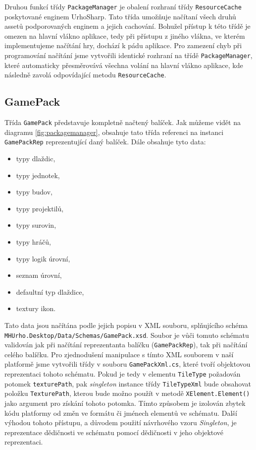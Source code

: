 Druhou funkcí třídy \texttt{PackageManager} je obalení rozhraní třídy \texttt{ResourceCache} poskytované enginem UrhoSharp. Tato třída umožňuje načítaní všech druhů assetů podporovaných enginem a jejich cachování. Bohužel přístup k této třídě je omezen na hlavní vlákno aplikace, tedy při přístupu z jiného vlákna, ve kterém implementujeme načítání hry, dochází k pádu aplikace. Pro zamezení chyb při programování načítání jsme vytvořili identické rozhraní na třídě \texttt{PackageManager}, které automaticky přesměrovává všechna volání na hlavní vlákno aplikace, kde následně zavolá odpovídající metodu \texttt{ResourceCache}.


\subsection{GamePack}
\label{sec:gamepack}


Třída \texttt{GamePack} představuje kompletně načtený balíček. Jak můžeme vidět na diagramu \ref{fig:packagemanager}, obsahuje tato třída referenci na instanci \texttt{GamePackRep} reprezentující daný balíček. Dále obsahuje tyto data:

\begin{itemize}
	\item typy dlaždic,
	\item typy jednotek,
	\item typy budov,
	\item typy projektilů,
	\item typy surovin,
	\item typy hráčů,
	\item typy logik úrovní,
	\item seznam úrovní,
	\item defaultní typ dlaždice,
	\item textury ikon.
\end{itemize}

Tato data jsou načítána podle jejich popisu v XML souboru, splňujícího schéma \texttt{MHUrho.Desktop/Data/Schemas/GamePack.xsd}. Soubor je vůči tomuto schématu validován jak při načítání reprezentanta balíčku (\texttt{GamePackRep}), tak při načítání celého balíčku. Pro zjednodušení manipulace s tímto XML souborem v naší platformě jsme vytvořili třídy v souboru \texttt{GamePackXml.cs}, které tvoří objektovou reprezentaci tohoto schématu. Pokud je tedy v elementu \texttt{TileType} požadován potomek \texttt{texturePath}, pak \textit{singleton} instance třídy \texttt{TileTypeXml} bude obsahovat položku \texttt{TexturePath}, kterou bude možno použít v metodě \texttt{XElement.Element()} jako argument pro získání tohoto potomka. Tímto způsobem je izolován zbytek kódu platformy od změn ve formátu či jménech elementů ve schématu. Další výhodou tohoto přístupu, a důvodem použití návrhového vzoru \textit{Singleton}, je reprezentace dědičnosti ve schématu pomocí dědičnosti v jeho objektové reprezentaci.

